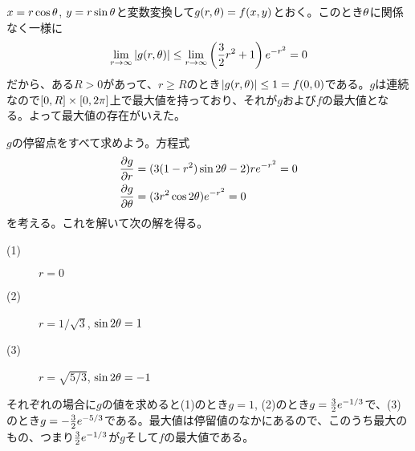 \newpage

\subsubsection{}%
\begin{sol}
  $x = r \cos {\theta}$, $y = r \sin {\theta}$と変数変換して$g(r, {\theta} ) = f(x,y)$とおく。このとき${\theta}$に関係なく一様に
  \[
  \lim_{r \to \infty} \left \lvert g(r,{\theta}) \right \rvert \leq \lim_{r \to \infty} \left( \frac{3}{2}r^2 + 1 \right) e^{-r^2} = 0
  \]
  だから、ある$R > 0$があって、$r \geq R$のとき$ \left \lvert g(r,{\theta}) \right \rvert \leq 1 = f(0,0)$である。$g$は連続なので$[0,R] \times [0,2\pi]$上で最大値を持っており、それが$g$および$f$の最大値となる。よって最大値の存在がいえた。

  $g$の停留点をすべて求めよう。方程式
\begin{align*}
\frac{\partial g}{\partial r} &= (3(1-r^2) \sin 2{\theta} - 2)re^{-r^2} = 0 \\
\frac{\partial g}{\partial {\theta}} &= (3r^2 \cos 2{\theta}) e^{-r^2} = 0
\end{align*}
を考える。これを解いて次の解を得る。
\begin{description}
  \item[(1)] $r=0$
  \item[(2)] $r= 1/ \sqrt{3}$, $\sin 2 {\theta} = 1$
  \item[(3)] $r = \sqrt{5/3}$, $\sin 2 {\theta} = -1$
\end{description}
それぞれの場合に$g$の値を求めると(1)のとき$g=1$, (2)のとき$g= \frac{3}{2} e^{- 1/3}$で、(3)のとき$g= - \frac{3}{2} e^{- 5/3}$である。最大値は停留値のなかにあるので、このうち最大のもの、つまり$\frac{3}{2} e^{- 1/3}$が$g$そして$f$の最大値である。
\end{sol}

\newpage

